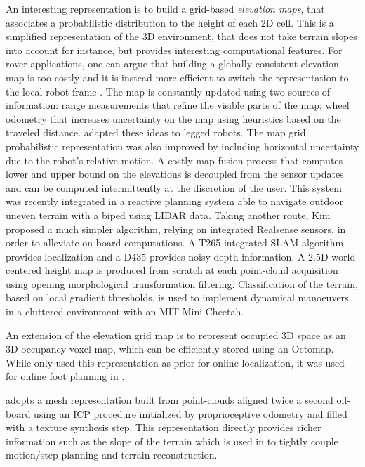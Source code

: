 An interesting representation is to build a grid-based \textit{elevation maps}, that associates a probabilistic distribution to the height of each 2D cell. 
This is a simplified representation of the 3D environment, that does not take terrain slopes into account for instance, but provides interesting computational features. 
For rover applications, one can argue that building a globally consistent elevation map is too costly and it is instead more efficient to switch the representation to 
the local robot frame \cite{kleiner2007real}. 
The map is constantly updated using two sources of information: range measurements that refine the visible parts of the map; wheel odometry that increases uncertainty on the map 
using heuristics based on the traveled distance. \cite{fankhauser2014robot, fankhauser2018probabilistic} adapted these ideas to legged robots. The map grid probabilistic representation
was also improved by including horizontal uncertainty due to the robot's relative motion. A costly map fusion process that computes lower and upper bound on the elevations
is decoupled from the sensor updates and can be computed intermittently at the discretion of the user. This system was recently integrated in a reactive planning system
\cite{huang2021efficient} able to navigate outdoor uneven terrain with a biped using LIDAR data. Taking another route, Kim \cite{kim2020vision} proposed a much 
simpler algorithm, relying on integrated Realsense sensors, in order to alleviate on-board computations. A T265 integrated SLAM algorithm provides localization and 
a D435 provides noisy depth information. A 2.5D world-centered height map is produced from scratch at each point-cloud acquisition using opening morphological 
transformation filtering. Classification of the terrain, based on local gradient thresholds, is used to implement dynamical manoeuvers in a cluttered environment
with an MIT Mini-Cheetah.

An extension of the elevation grid map is to represent occupied 3D space as an 3D occupancy voxel map, which can be efficiently stored using an Octomap.
While \cite{hornung2014monte, fallon2014drift} only used this representation as prior for online localization, it was used for online foot planning in 
\cite{winkler2015planning, mastalli2015line}. 

\cite{kolter2009stereo} adopts a mesh representation built from point-clouds aligned twice a second off-board using an ICP procedure initialized by proprioceptive odometry and filled with
a texture synthesis step. This representation directly provides richer information such as the slope of the terrain which is used in \cite{mastalli2020motion} to 
tightly couple motion/step planning and terrain reconstruction.

